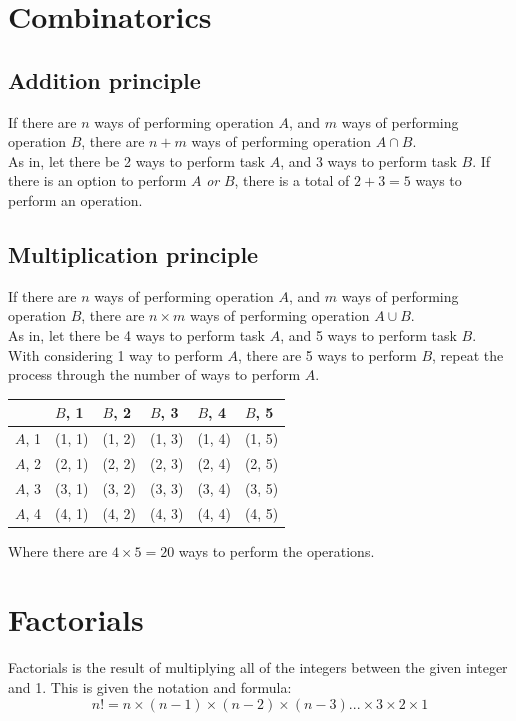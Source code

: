 \documentclass{book}
\begin{document}
\chapter{Combinatorics}
\section{Addition principle}
If there are $n$ ways of performing operation $A$, and $m$ ways of performing operation $B$, there are $n + m$ ways of performing operation $A \cap B$.\\

As in, let there be 2 ways to perform task $A$, and 3 ways to perform task $B$.  If there is an option to perform $A$ \emph{or} $B$, there is a total of $2 + 3 = 5$ ways to perform an operation.

\section{Multiplication principle}
If there are $n$ ways of performing operation $A$, and $m$ ways of performing operation $B$, there are $n \times m$ ways of performing operation $A \cup B$.\\

As in, let there be 4 ways to perform task $A$, and 5 ways to perform task $B$.  With considering 1 way to perform $A$, there are 5 ways to perform $B$, repeat the process through the number of ways to perform $A$.

\begin{center}
	\begin{tabular}{l|lllll}
		       & $B$, 1 & $B$, 2 & $B$, 3 & $B$, 4 & $B$, 5 \\ \hline
		$A$, 1 & (1, 1) & (1, 2) & (1, 3) & (1, 4) & (1, 5) \\
		$A$, 2 & (2, 1) & (2, 2) & (2, 3) & (2, 4) & (2, 5) \\
		$A$, 3 & (3, 1) & (3, 2) & (3, 3) & (3, 4) & (3, 5) \\
		$A$, 4 & (4, 1) & (4, 2) & (4, 3) & (4, 4) & (4, 5) \\
	\end{tabular}
\end{center}
Where there are $4 \times 5 = 20$ ways to perform the operations.


\chapter{Factorials}
Factorials is the result of multiplying all of the integers between the given integer and 1.  This is given the notation and formula:
\[
	n! = n \times (n-1) \times (n-2) \times (n-3)... \times 3 \times 2 \times 1
\]
\end{document}
